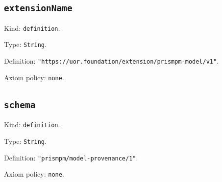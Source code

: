 \documentclass[11pt]{article}
\begin{document}
\subsection*{\texttt{extensionName}}
\noindent Kind: \texttt{definition}.\par
\noindent Type: \texttt{String}.\par
\noindent Definition: \texttt{"https://uor.foundation/extension/prismpm-model/v1"}.\par
\noindent Axiom policy: \texttt{none}.\par
\subsection*{\texttt{schema}}
\noindent Kind: \texttt{definition}.\par
\noindent Type: \texttt{String}.\par
\noindent Definition: \texttt{"prismpm/model-provenance/1"}.\par
\noindent Axiom policy: \texttt{none}.\par
\end{document}
